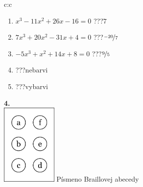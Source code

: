 \documentclass[10pt]{report}
\begin{document}
\begin{tabular}{c:c}
\begin{minipage}[c][104.5mm][t]{0.5\linewidth}
\begin{center}
\begin{minipage}{0.79\linewidth}
\begin{center}
\begin{varwidth}{\linewidth}
\begin{enumerate}
\item $x^3-11x^2+26x-16=0$\quad \dotfill\; ???\;\dotfill \quad $7$
\item $7x^3+20x^2-31x+4=0$\quad \dotfill\; ???\;\dotfill \quad $\nicefrac{-20}{7}$
\item $-5x^3+x^2+14x+8=0$\quad \dotfill\; ???\;\dotfill \quad $\nicefrac{9}{5}$
\item \quad \dotfill\; ???\;\dotfill \quad nebarvi
\item \quad \dotfill\; ???\;\dotfill \quad vybarvi
\end{enumerate}
\end{varwidth}
\end{center}
\end{minipage}
\begin{minipage}{0.20\linewidth}
\begin{center}
{\Huge\bfseries 4.} \\[2mm]
\includegraphics[height=40mm]{../images/braille.png}
{\small Písmeno Braillovej abecedy}
\end{center}
\end{minipage}
\end{center}
\end{minipage}
%
\end{tabular}
\newpage
\thispagestyle{empty}
\end{document}

